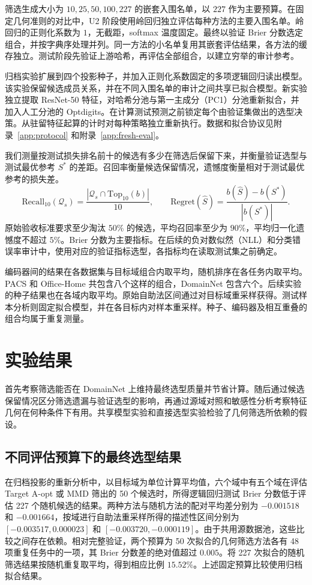\documentclass[UTF8,fontset=fandol,scheme=chinese,zihao=false,11pt,letterpaper]{ctexart}
\newcommand{\cQ}{\mathcal{Q}}
\begin{document}
筛选生成大小为 $10,25,50,100,227$ 的嵌套入围名单，以 $227$ 作为主要预算。在固定几何准则的对比中，U2 阶段使用岭回归独立评估每种方法的主要入围名单。岭回归的正则化系数为 $1$，无截距，softmax 温度固定。最终以验证 Brier 分数选定组合，并按字典序处理并列。同一方法的小名单复用其嵌套评估结果，各方法的缓存独立。测试阶段先验证上游哈希，再评估全部组合，以建立穷举的审计参考。

归档实验扩展到四个投影种子，并加入正则化系数固定的多项逻辑回归读出模型。该实验保留候选成员关系，并在不同入围名单的审计之间共享已拟合模型。新实验独立提取 ResNet-50 特征，对哈希分池与第一主成分（PC1）分池重新拟合，并加入人工分池的 Optdigits。在计算测试预测之前锁定每个由验证集做出的选型决策。从驻留特征起算的计时对每种策略独立重新执行。数据和拟合协议见附录~\ref{app:protocol} 和附录~\ref{app:fresh-eval}。

我们测量按测试损失排名前十的候选有多少在筛选后保留下来，并衡量验证选型与测试最优参考 $S^*$ 的差距。召回率衡量候选保留情况，遗憾度衡量相对于测试最优参考的损失差。
\begin{equation}
 \mathrm{Recall}_{10}(\cQ_s)=\frac{|\cQ_s\cap\mathrm{Top}_{10}(b)|}{10},\qquad
 \mathrm{Regret}(\widehat S)=\frac{b(\widehat S)-b(S^*)}{|b(S^*)|}.
 \label{eq:metrics}
\end{equation}
原始验收标准要求至少淘汰 $50\%$ 的候选，平均召回率至少为 $90\%$，平均归一化遗憾度不超过 $5\%$。Brier 分数为主要指标。在后续的负对数似然（NLL）和分类错误率审计中，使用对应的验证指标选型，各指标均在读取测试集之前确定。

编码器间的结果在各数据集与目标域组合内取平均，随机排序在各任务内取平均。PACS 和 Office-Home 共包含八个这样的组合，DomainNet 包含六个。后续实验的种子结果也在各域内取平均。原始自助法区间通过对目标域重采样获得。测试样本分析则固定拟合模型，并在各目标内对样本重采样。种子、编码器及相互重叠的组合均属于重复测量。

\section{实验结果}
\label{sec:results}
首先考察筛选能否在 DomainNet 上维持最终选型质量并节省计算。随后通过候选保留情况区分筛选遗漏与验证选型的影响，再通过源域对照和敏感性分析考察特征几何在何种条件下有用。共享模型实验和直接选型实验检验了几何筛选所依赖的假设。

\subsection{不同评估预算下的最终选型结果}
\label{sec:budget}
在归档投影的重新分析中，以目标域为单位计算平均值，六个域中有五个域在评估 Target A-opt 或 MMD 筛出的 50 个候选时，所得逻辑回归测试 Brier 分数低于评估 227 个随机候选的结果。两种方法与随机方法的配对平均差分别为 $-0.001518$ 和 $-0.001664$，按域进行自助法重采样所得的描述性区间分别为 $[-0.003517,0.000023]$ 和 $[-0.003720,-0.000119]$。由于共用源数据池，这些比较之间存在依赖。相对完整验证，两个预算为 50 次拟合的几何筛选方法各有 48 项重复任务中的一项，其 Brier 分数差的绝对值超过 $0.005$。将 227 次拟合的随机筛选结果按随机重复取平均，得到相应比例 $15.52\%$。上述固定预算比较使用归档拟合结果。
\end{document}
